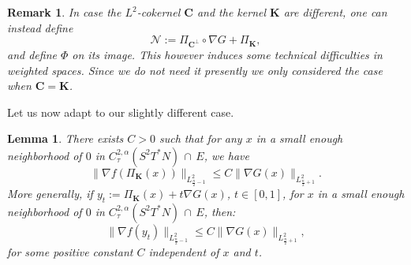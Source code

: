 \documentclass[a4paper,11pt,reqno]{amsart}
\newtheorem{lemma}[defn]{Lemma}
\newtheorem{rk}[defn]{Remark}
\numberwithin{equation}{section}
\begin{document}
	\begin{rk}
		In case the $L^2$-cokernel $\mathbf{C}$ and the kernel $\mathbf{K}$ are different, one can instead define $$\mathcal{N} := \Pi_{\mathbf{C}^\perp}\circ \nabla G +\Pi_\mathbf{K},$$
		and define $\Phi$ on its image. This however induces some technical difficulties in weighted spaces. Since we do not need it presently we only considered the case when $\mathbf{C} = \mathbf{K}$.
	\end{rk}
	
	Let us now adapt \cite[Lemma 7.10]{Col-Min-Ein-Tan-Con} to our slightly different case.
	\begin{lemma}\label{control nabla f Pi nabla G}
		There exists $C>0$ such that for any $x$ in a small enough neighborhood of $0$ in $C^{2,\alpha}_{\tau}(S^2T^*N)\,\cap\, E$, we have 
		\begin{equation}
		\|\nabla f(\Pi_\mathbf{K}(x))\|_{L^2_{\frac{n}{2}-1}}\leq C\|\nabla G(x)\|_{L^2_{\frac{n}{2}+1}}.\label{est-nabla-f-nabla-G}
		\end{equation}
		More generally, if $y_t:=\Pi_{\mathbf{K}}(x)+t\nabla G(x)$, $t\in[0,1]$, for $x$ in a small enough neighborhood of $0$ in $C^{2,\alpha}_{\tau}(S^2T^*N)\,\cap\, E$, then:
		\begin{equation}
		\|\nabla f(y_t)\|_{L^2_{\frac{n}{2}-1}}\leq C\|\nabla G(x)\|_{L^2_{\frac{n}{2}+1}},\label{est-nabla-f-nabla-G-path}
		\end{equation}
		for some positive constant $C$ independent of $x$ and $t$.
	\end{lemma}
\end{document}
